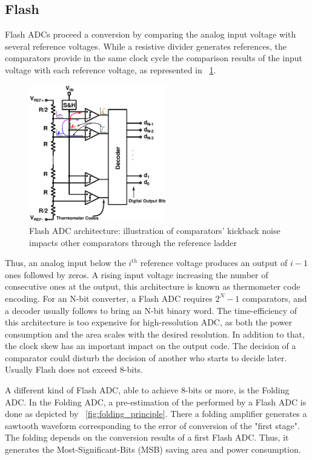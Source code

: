 \subsection{Flash}                             %
\label{sec:flash-adc}
Flash ADCs proceed a conversion by comparing the analog input voltage with several reference voltages. While a resistive divider generates references, the comparators provide in the same clock cycle the comparison results of the input voltage with each reference voltage, as represented in \figurename~\ref{fig:flash_kickback}. 

\begin{figure}[htp]
	\centering
	\includegraphics[height=6cm]{Chapter3/Figs/flash_adc.ps}
	\caption{Flash ADC architecture: illustration of comparators' kickback noise impacts other comparators through the reference ladder}
	\label{fig:flash_kickback}
\end{figure}

Thus, an analog input below the \(i^{th} \) reference voltage produces an output of \(i-1 \) ones followed by zeros. A rising input voltage increasing the number of consecutive ones at the output, this architecture is known as thermometer code encoding. For an N-bit converter, a Flash ADC requires \(2^N-1\) comparators, and a decoder usually follows to bring an N-bit binary word. The time-efficiency of this architecture is too expensive for high-resolution ADC, as both the power consumption and the area scales with the desired resolution. In addition to that, the clock skew has an important impact on the output code. The decision of a comparator could disturb the decision of another who starts to decide later. Usually Flash does not exceed 8-bits.

A different kind of Flash ADC, able to achieve 8-bits or more, is the Folding ADC. In the Folding ADC, a pre-estimation of the performed by a Flash ADC is done as depicted by \figurename~\ref{fig:folding_principle}. There a folding amplifier generates a sawtooth waveform corresponding to the error of conversion of the "first stage". The folding depends on the conversion results of a first Flash ADC. Thus, it generates the Most-Significant-Bits (MSB) saving area and power consumption.

